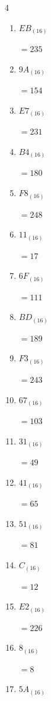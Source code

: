 \begin{multicols}{4}
\begin{enumerate}
  \item $EB_{(16)}$

        $=235$

  \item $9A_{(16)}$

        $=154$

  \item $E7_{(16)}$

        $=231$

  \item $B4_{(16)}$

        $=180$

  \item $F8_{(16)}$

        $=248$

  \item $11_{(16)}$

        $=17$

  \item $6F_{(16)}$

        $=111$

  \item $BD_{(16)}$

        $=189$

\columnbreak %

  \item $F3_{(16)}$

        $=243$

  \item $67_{(16)}$

        $=103$

  \item $31_{(16)}$

        $=49$

  \item $41_{(16)}$

        $=65$

  \item $51_{(16)}$

        $=81$

  \item $C_{(16)}$

        $=12$

  \item $E2_{(16)}$

        $=226$

  \item $8_{(16)}$

        $=8$

  \item $5A_{(16)}$


\end{enumerate}
\end{multicols}
